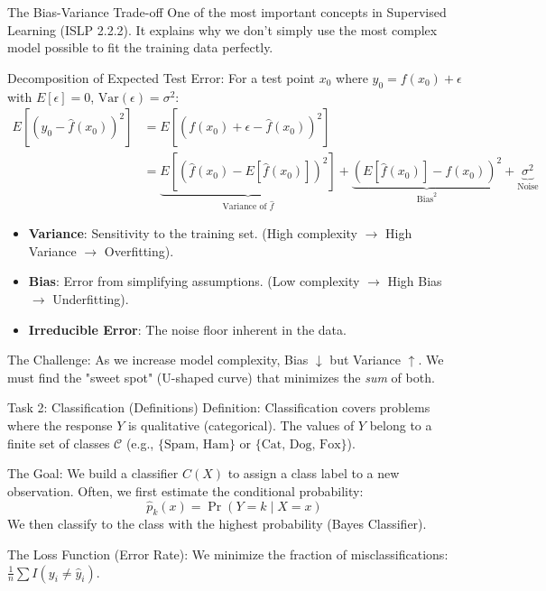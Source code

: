 \documentclass[aspectratio=169]{beamer}
\newcommand{\1}{\mathbf{1}}
\begin{document}
\begin{frame}{The Bias-Variance Trade-off}
    \small
    One of the most important concepts in Supervised Learning (ISLP 2.2.2).
    It explains why we don't simply use the most complex model possible to fit the training data perfectly.

    Decomposition of Expected Test Error:
    For a test point $x_0$ where $y_0 = f(x_0) + \epsilon$ with $E[\epsilon]=0$, $\text{Var}(\epsilon)=\sigma^2$:
    \begin{align*}
    E\left[ (y_0 - \hat{f}(x_0))^2 \right] &= E\left[ (f(x_0) + \epsilon - \hat{f}(x_0))^2 \right] \\[0.3em]
    &= \underbrace{E\left[(\hat{f}(x_0) - E[\hat{f}(x_0)])^2\right]}_{\text{Variance of } \hat{f}} + \underbrace{(E[\hat{f}(x_0)] - f(x_0))^2}_{\text{Bias}^2} + \underbrace{\sigma^2}_{\text{Noise}}
    \end{align*}

    \begin{itemize}
        \item \textbf{Variance}: Sensitivity to the training set. (High complexity $\to$ High Variance $\to$ Overfitting).
        \item \textbf{Bias}: Error from simplifying assumptions. (Low complexity $\to$ High Bias $\to$ Underfitting).
        \item \textbf{Irreducible Error}: The noise floor inherent in the data.
    \end{itemize}

    The Challenge:
    As we increase model complexity, Bias $\downarrow$ but Variance $\uparrow$. We must find the "sweet spot" (U-shaped curve) that minimizes the \textit{sum} of both.
\end{frame}

    

\begin{frame}{Task 2: Classification (Definitions)}
    Definition:
    Classification covers problems where the response $Y$ is qualitative (categorical).
    The values of $Y$ belong to a finite set of classes $\mathcal{C}$ (e.g., $\{\text{Spam, Ham}\}$ or $\{\text{Cat, Dog, Fox}\}$).

    \vspace{0.5em}
    The Goal:
    We build a classifier $C(X)$ to assign a class label to a new observation.
    Often, we first estimate the conditional probability:
    $$ \hat{p}_k(x) = \Pr(Y = k \mid X = x) $$
    We then classify to the class with the highest probability (Bayes Classifier).

    \vspace{0.5em}
    The Loss Function (Error Rate):
    We minimize the fraction of misclassifications: $\frac{1}{n} \sum I(y_i \neq \hat{y}_i)$.
\end{frame}
\end{document}
